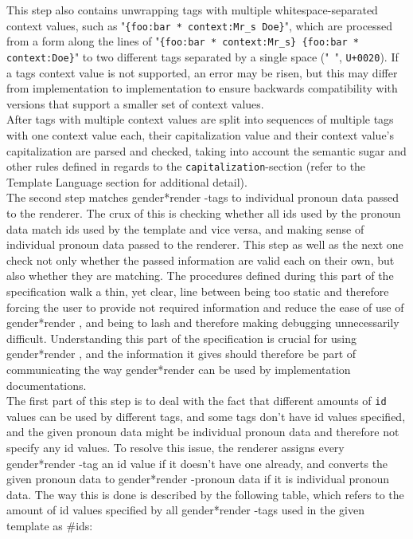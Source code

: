 \documentclass{article}
\newcommand{\GenderRender}{
    gender*render
}
\begin{document}
    This step also contains unwrapping tags with multiple whitespace-separated context values, such as "\texttt{\{foo:bar * context:Mr\_s Doe\}}", which are processed from a form along the lines of "\texttt{\{foo:bar * context:Mr\_s\} \{foo:bar * context:Doe\}}" to two different tags separated by a single space ("\texttt{ }", \texttt{U+0020}).
    If a tags context value is not supported, an error may be risen, but this may differ from implementation to implementation to ensure backwards compatibility with versions that support a smaller set of context values.\\

    After tags with multiple context values are split into sequences of multiple tags with one context value each, their capitalization value and their context value's capitalization are parsed and checked, taking into account the semantic sugar and other rules defined in regards to the \texttt{capitalization}-section (refer to the Template Language section for additional detail).\\

    The second step matches \GenderRender-tags to individual pronoun data passed to the renderer.
    The crux of this is checking whether all ids used by the pronoun data match ids used by the template and vice versa, and making sense of individual pronoun data passed to the renderer.
    This step as well as the next one check not only whether the passed information are valid each on their own, but also whether they are matching.
    The procedures defined during this part of the specification walk a thin, yet clear, line between being too static and therefore forcing the user to provide not required information and reduce the ease of use of \GenderRender, and being to lash and therefore making debugging unnecessarily difficult.
    Understanding this part of the specification is crucial for using \GenderRender, and the information it gives should therefore be part of communicating the way \GenderRender can be used by implementation documentations.\\

    The first part of this step is to deal with the fact that different amounts of \texttt{id} values can be used by different tags, and some tags don't have id values specified, and the given pronoun data might be individual pronoun data and therefore not specify any id values.
    To resolve this issue, the renderer assigns every \GenderRender-tag an id value if it doesn't have one already, and converts the given pronoun data to \GenderRender-pronoun data if it is individual pronoun data.
    The way this is done is described by the following table, which refers to the amount of id values specified by all \GenderRender-tags used in the given template as \#ids:
\end{document}
